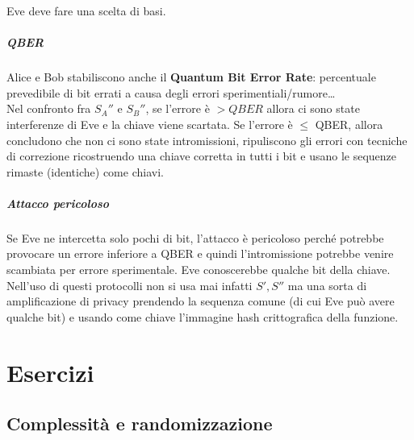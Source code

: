 \documentclass[10pt]{book}
\begin{document}
Eve deve fare una scelta di basi.
\paragraph{QBER} Alice e Bob stabiliscono anche il \textbf{Quantum Bit Error Rate}: percentuale prevedibile di bit errati a causa degli errori sperimentiali/rumore\ldots\\
Nel confronto fra $S_A''$ e $S_B''$, se l'errore è $> QBER$ allora ci sono state interferenze di Eve e la chiave viene scartata. Se l'errore è $\leq$ QBER, allora concludono che non ci sono state intromissioni, ripuliscono gli errori con tecniche di correzione ricostruendo una chiave corretta in tutti i bit e usano le sequenze rimaste (identiche) come chiavi.
\paragraph{Attacco pericoloso} Se Eve ne intercetta solo pochi di bit, l'attacco è pericoloso perché potrebbe provocare un errore inferiore a QBER e quindi l'intromissione potrebbe venire scambiata per errore sperimentale. Eve conoscerebbe qualche bit della chiave.\\
Nell'uso di questi protocolli non si usa mai infatti $S', S''$ ma una sorta di amplificazione di privacy prendendo la sequenza comune (di cui Eve può avere qualche bit) e usando come chiave l'immagine hash crittografica della funzione.
\chapter{Esercizi}
\section{Complessità e randomizzazione}
\end{document}
